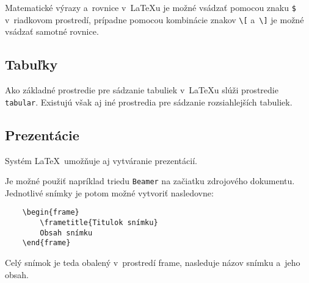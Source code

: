 \documentclass[a4paper, 11pt, a4paper]{article}
\begin{document}
Matematické výrazy a~rovnice v~\LaTeX u je možné vsádzať pomocou znaku \verb|$| v~riadkovom prostredí, prípadne pomocou kombinácie znakov \verb|\[| a~\verb|\]| je možné vsádzať samotné rovnice.~\cite{Kalvoda.LatexMath.2021}

\subsection{Tabuľky}

Ako základné prostredie pre sádzanie tabuliek v~\LaTeX u slúži prostredie \texttt{tabular}. Existujú však aj iné prostredia pre sádzanie rozsiahlejších tabuliek.~\cite{Svamberg.Tab.2001}

\subsection{Prezentácie}

Systém \LaTeX\ umožňuje aj vytváranie prezentácií.

Je možné použiť napríklad triedu \texttt{Beamer} na začiatku zdrojového dokumentu. Jednotlivé snímky je potom možné vytvoriť nasledovne:
\begin{verbatim}
    \begin{frame}
        \frametitle{Titulok snímku}
        Obsah snímku
    \end{frame}
\end{verbatim}
Celý snímok je teda obalený v~prostredí frame, nasleduje názov snímku a~jeho obsah.~\cite{Cerny.prezentace.2011}


\newpage


\renewcommand{\refname}{Literatúra}

\end{document}
